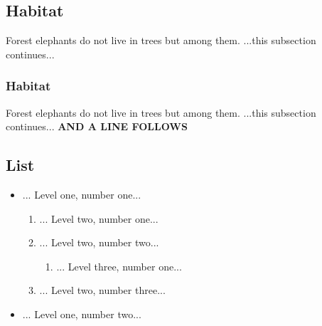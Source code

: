 \documentclass{article}
\begin{document}
\subsection{Habitat}
\par Forest elephants do not live in trees but among them.
...this subsection continues... 
\subsubsection{Habitat}
\par Forest elephants do not live in trees but among them.
...this subsection continues...  \textbf{AND A LINE FOLLOWS}
\subsection{List}
\begin{itemize}
\item ... Level one, number one...
\begin{enumerate}
\item ... Level two, number one...
\item ... Level two, number two...
\begin{enumerate}
\item ... Level three, number one...
\end{enumerate}
\item ... Level two, number three...
\end{enumerate}
\item ... Level one, number two...
\end{itemize}
\end{document}

